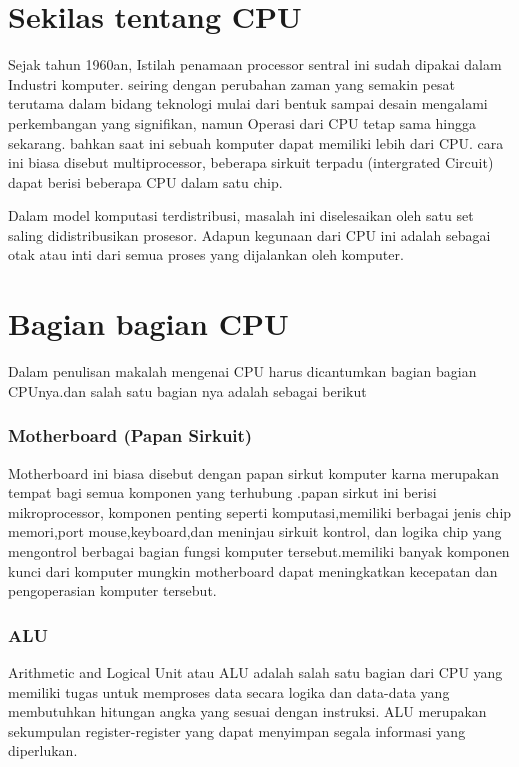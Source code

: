  	\section{Sekilas tentang CPU}
 	Sejak tahun 1960an, Istilah penamaan processor sentral ini sudah dipakai dalam Industri komputer. seiring dengan perubahan zaman yang semakin pesat terutama dalam bidang teknologi mulai dari bentuk sampai desain mengalami perkembangan yang signifikan, namun Operasi dari CPU tetap sama hingga sekarang. bahkan saat ini sebuah komputer dapat memiliki lebih dari CPU. cara ini biasa disebut multiprocessor, beberapa sirkuit terpadu (intergrated Circuit) dapat berisi beberapa CPU dalam satu chip.
 
 	Dalam model komputasi terdistribusi, masalah ini diselesaikan oleh satu set saling didistribusikan prosesor. Adapun kegunaan dari CPU ini adalah sebagai otak atau inti dari semua proses yang dijalankan oleh komputer.



 	\section{Bagian bagian CPU}
 	Dalam penulisan makalah mengenai CPU harus dicantumkan bagian bagian CPUnya.dan salah satu bagian nya adalah sebagai berikut
 			\subsubsection{Motherboard (Papan Sirkuit)}
 		Motherboard ini biasa disebut dengan papan sirkut komputer karna merupakan tempat bagi semua komponen yang terhubung .papan sirkut ini berisi mikroprocessor, komponen penting seperti komputasi,memiliki berbagai jenis chip memori,port mouse,keyboard,dan meninjau sirkuit kontrol, dan logika chip yang mengontrol berbagai bagian fungsi komputer tersebut.memiliki banyak komponen kunci dari komputer mungkin motherboard dapat meningkatkan kecepatan dan pengoperasian komputer tersebut.


 			\subsubsection{ALU}
 		Arithmetic and Logical Unit atau ALU adalah salah satu bagian dari CPU yang memiliki tugas untuk memproses data secara logika dan data-data yang membutuhkan hitungan angka yang sesuai dengan instruksi. ALU merupakan sekumpulan register-register yang dapat menyimpan segala informasi yang diperlukan.
